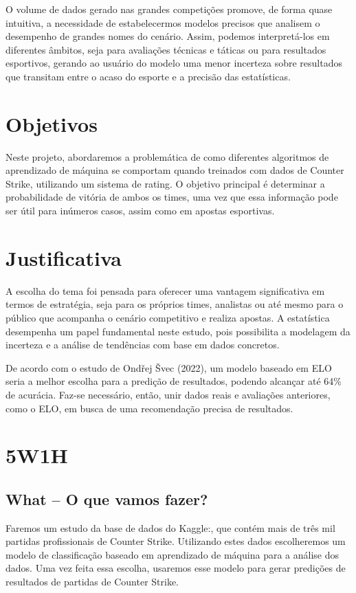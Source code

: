\documentclass[a4paper,times,12pt]{article}
\begin{document}
O volume de dados gerado nas grandes competições promove, de forma quase intuitiva, a necessidade de estabelecermos modelos precisos que analisem o desempenho de grandes nomes do cenário. Assim, podemos interpretá-los em diferentes âmbitos, seja para avaliações técnicas e táticas ou para resultados esportivos, gerando ao usuário do modelo uma menor incerteza sobre resultados que transitam entre o acaso do esporte e a precisão das estatísticas.

\section{Objetivos}
\hspace{+15pt}
Neste projeto, abordaremos a problemática de como diferentes algoritmos de aprendizado de máquina se comportam quando treinados com dados de Counter Strike, utilizando um sistema de rating. O objetivo principal é determinar a probabilidade de vitória de ambos os times, uma vez que essa informação pode ser útil para inúmeros casos, assim como em apostas esportivas.


\section{Justificativa}
\hspace{+15pt}
A escolha do tema foi pensada para oferecer uma vantagem significativa em termos de estratégia, seja para os próprios times, analistas ou até mesmo para o público que acompanha o cenário competitivo e realiza apostas. A estatística desempenha um papel fundamental neste estudo, pois possibilita a modelagem da incerteza e a análise de tendências com base em dados concretos.

De acordo com o estudo de Ondřej Švec (2022), um modelo baseado em ELO seria a melhor escolha para a predição de resultados, podendo alcançar até 64\% de acurácia. Faz-se necessário, então, unir dados reais e avaliações anteriores, como o ELO, em busca de uma recomendação precisa de resultados.

\section{5W1H}
\subsection*{What – O que vamos fazer?}
\hspace{+15pt}
Faremos um estudo da base de dados do Kaggle:\cite{Kaggle}, que contém mais de três mil partidas profissionais de Counter Strike. 
Utilizando estes dados escolheremos um modelo de classificação baseado em aprendizado de máquina para a análise dos dados. Uma vez feita essa escolha, usaremos esse modelo para gerar predições de resultados de partidas de Counter Strike.
\end{document}
